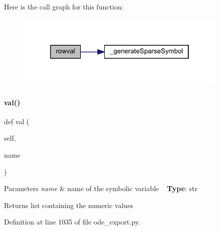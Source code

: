 Here is the call graph for this function\+:
\nopagebreak
\begin{figure}[H]
\begin{center}
\leavevmode
\includegraphics[width=287pt]{classamici_1_1ode__export_1_1_o_d_e_model_af1c1cc87fcc84bb17f41ee7fabaf795d_cgraph}
\end{center}
\end{figure}
\mbox{\label{classamici_1_1ode__export_1_1_o_d_e_model_a8d081fd7c43cbb2bce7b4eca67fb94c5}} 
\paragraph{\texorpdfstring{val()}{val()}}
{\footnotesize\ttfamily def val (\begin{DoxyParamCaption}\item[{}]{self,  }\item[{}]{name }\end{DoxyParamCaption})}


\begin{DoxyParams}{Parameters}
{\em name} & name of the symbolic variable ~\newline
{\bfseries Type}\+: str\\
\hline
\end{DoxyParams}
\begin{DoxyReturn}{Returns}
list containing the numeric values 
\end{DoxyReturn}


Definition at line 1035 of file ode\+\_\+export.\+py.

